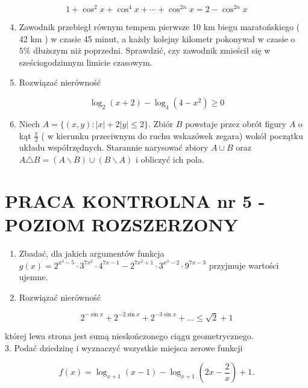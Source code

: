 \documentclass[10pt]{article}
\begin{document}
$$
1+\cos ^{2} x+\cos ^{4} x+\cdots+\cos ^{2 n} x=2-\cos ^{2 n} x
$$

\begin{enumerate}
  \setcounter{enumi}{3}
  \item Zawodnik przebiegł równym tempem pierwsze 10 km biegu maratońskiego ( 42 km ) w czasie 45 minut, a każdy kolejny kilometr pokonywał w czasie o $5 \%$ dłuższym niż poprzedni. Sprawdzić, czy zawodnik zmieścił się w sześciogodzinnym limicie czasowym.
  \item Rozwiązać nierówność
\end{enumerate}

$$
\log _{2}(x+2)-\log _{4}\left(4-x^{2}\right) \geqslant 0
$$

\begin{enumerate}
  \setcounter{enumi}{5}
  \item Niech $A=\{(x, y):|x|+2|y| \leqslant 2\}$. Zbiór $B$ powstaje przez obrót figury $A$ o kąt $\frac{\pi}{2}$ ( w kierunku przeciwnym do ruchu wskazówek zegara) wokół początku układu współrzędnych. Starannie narysować zbiory $A \cup B$ oraz $A \triangle B=(A \backslash B) \cup(B \backslash A)$ i obliczyć ich pola.
\end{enumerate}

\section*{PRACA KONTROLNA nr 5 - POZIOM ROZSZERZONY}
\begin{enumerate}
  \item Zbadać, dla jakich argumentów funkcja $g(x)=2^{x^{3}-5} \cdot 3^{7 x^{2}} \cdot 4^{7 x-1}-2^{7 x^{2}+1} \cdot 3^{x^{3}-2} \cdot 9^{7 x-3}$ przyjmuje wartości ujemne.
  \item Rozwiązać nierówność
\end{enumerate}

$$
2^{-\sin x}+2^{-2 \sin x}+2^{-3 \sin x}+\ldots \leqslant \sqrt{2}+1
$$

której lewa strona jest sumą nieskończonego ciągu geometrycznego.\\
3. Podać dziedzinę i wyznaczyć wszystkie miejsca zerowe funkcji

$$
f(x)=\log _{x+1}(x-1)-\log _{x+1}\left(2 x-\frac{2}{x}\right)+1 .
$$
\end{document}
